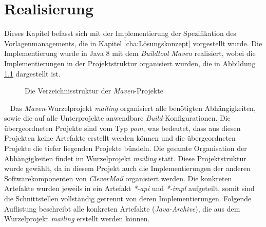 \chapter{Realisierung}
\label{cha:Realisierung}
Dieses Kapitel befasst sich mit der Implementierung der Spezifikation des Vorlagenmanagements, die in Kapitel \ref{cha:Lösungskonzept} vorgestellt wurde. Die Implementierung wurde in Java 8 mit dem \emph{Buildtool Maven} realisiert, wobei die Implementierungen in der Projektstruktur organisiert wurden, die in Abbildung \ref{fig:minimal-example:frame-dirtree} dargestellt ist.
\begin{figure}[h]
\caption{Die Verzeichnisstruktur der \emph{Maven}-Projekte}
\label{fig:minimal-example:frame-dirtree}
\end{figure}
\ \newline
Das \emph{Maven}-Wurzelprojekt \emph{mailing} organisiert alle benötigten Abhängigkeiten, sowie die auf alle Unterprojekte anwendbare \emph{Build}-Konfigurationen. Die übergeordneten Projekte sind vom Typ \emph{pom}, was bedeutet, dass aus diesen Projekten keine Artefakte erstellt werden können und die übergeordneten Projekte die tiefer liegenden Projekte bündeln. Die gesamte Organisation der Abhängigkeiten findet im Wurzelprojekt \emph{mailing} statt. Diese Projektstruktur wurde gewählt, da in diesem Projekt auch die Implementierungen der anderen Softwarekomponenten von \emph{CleverMail} organisiert werden. 
\newline
\newline
Die konkreten Artefakte wurden jeweils in ein Artefakt \emph{*-api} und \emph{*-impl} aufgeteilt, somit sind die Schnittstellen  vollständig getrennt von deren Implementierungen. 
\newline
\newline
Folgende Auflistung beschreibt alle konkreten Artefakte (\emph{Java-Archive}), die aus dem Wurzelprojekt \emph{mailing} erstellt werden können.
